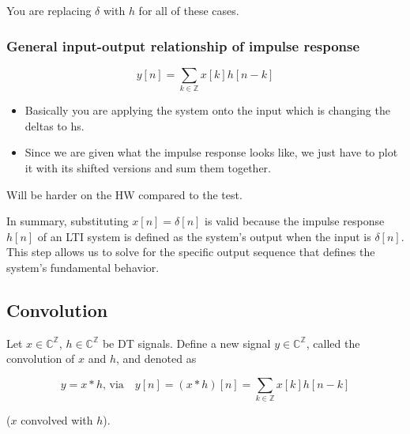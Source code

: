\begin{warning}
    You are replacing $\delta$ with $h$ for all of these cases.
\end{warning}

\subsubsection{General input-output relationship of impulse response}
\begin{definition}
    \begin{equation}
        y[n] = \sum_{k \in \mathbb{Z}} x[k] h[n-k]
    \end{equation}
\end{definition}

\begin{example}
    \begin{itemize}
        \item Basically you are applying the system onto the input which is changing the deltas to hs. 
        \item Since we are given what the impulse response looks like, we just have to plot it with its shifted versions and sum them together.
    \end{itemize}
\end{example}

\begin{warning}
    Will be harder on the HW compared to the test. 
\end{warning}

\begin{intuition}
    In summary, substituting \( x[n] = \delta[n] \) is valid because the impulse response \( h[n] \) of an LTI system is defined as the system's output when the input is \( \delta[n] \). This step allows us to solve for the specific output sequence that defines the system's fundamental behavior.
\end{intuition}

\subsection{Convolution}
\begin{definition}
    Let \( x \in \mathbb{C}^{\mathbb{Z}} \), \( h \in \mathbb{C}^{\mathbb{Z}} \) be DT signals. Define a new signal \( y \in \mathbb{C}^{\mathbb{Z}} \), called the convolution of \( x \) and \( h \), and denoted as

    \begin{equation}
        y = x * h, \, \text{via} \quad y[n] = (x * h)[n] = \sum_{k \in \mathbb{Z}} x[k]h[n-k]
    \end{equation}

    (\( x \) convolved with \( h \)).

\end{definition}

